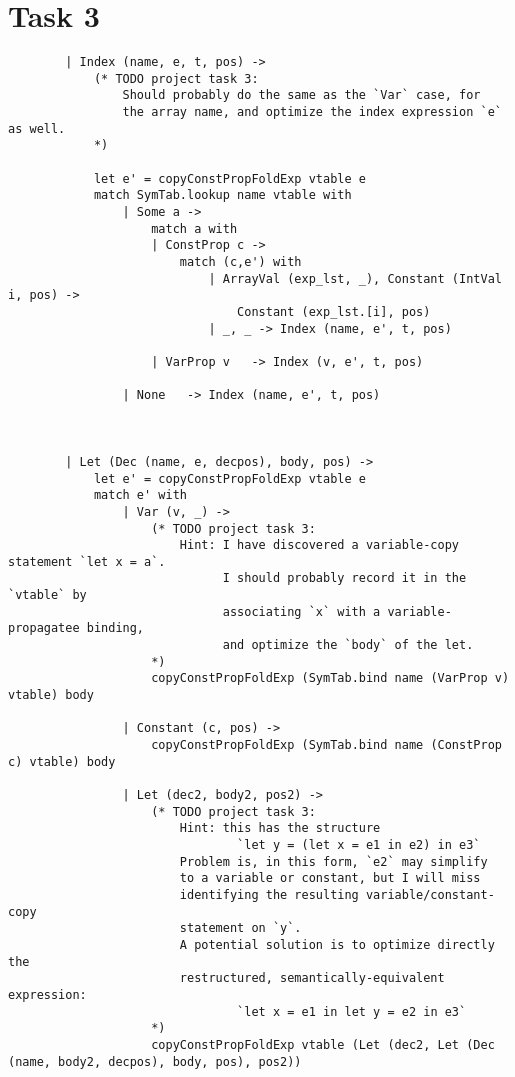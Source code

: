 \pagebreak
\section*{Task 3}

\begin{verbatim}
        | Index (name, e, t, pos) ->
            (* TODO project task 3:
                Should probably do the same as the `Var` case, for
                the array name, and optimize the index expression `e` as well.
            *)

            let e' = copyConstPropFoldExp vtable e
            match SymTab.lookup name vtable with
                | Some a ->
                    match a with
                    | ConstProp c -> 
                        match (c,e') with
                            | ArrayVal (exp_lst, _), Constant (IntVal i, pos) -> 
                                Constant (exp_lst.[i], pos)
                            | _, _ -> Index (name, e', t, pos)

                    | VarProp v   -> Index (v, e', t, pos)

                | None   -> Index (name, e', t, pos)



        | Let (Dec (name, e, decpos), body, pos) ->
            let e' = copyConstPropFoldExp vtable e
            match e' with
                | Var (v, _) ->
                    (* TODO project task 3:
                        Hint: I have discovered a variable-copy statement `let x = a`.
                              I should probably record it in the `vtable` by
                              associating `x` with a variable-propagatee binding,
                              and optimize the `body` of the let.
                    *)
                    copyConstPropFoldExp (SymTab.bind name (VarProp v) vtable) body

                | Constant (c, pos) ->
                    copyConstPropFoldExp (SymTab.bind name (ConstProp c) vtable) body

                | Let (dec2, body2, pos2) ->
                    (* TODO project task 3:
                        Hint: this has the structure
                                `let y = (let x = e1 in e2) in e3`
                        Problem is, in this form, `e2` may simplify
                        to a variable or constant, but I will miss
                        identifying the resulting variable/constant-copy
                        statement on `y`.
                        A potential solution is to optimize directly the
                        restructured, semantically-equivalent expression:
                                `let x = e1 in let y = e2 in e3`
                    *)
                    copyConstPropFoldExp vtable (Let (dec2, Let (Dec (name, body2, decpos), body, pos), pos2))
\end{verbatim}

